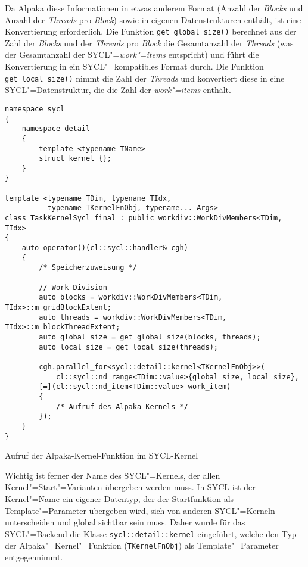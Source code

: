 Da Alpaka diese Informationen in etwas anderem Format (Anzahl der
\textit{Blocks} und Anzahl der \textit{Threads} pro \textit{Block}) sowie in
eigenen Datenstrukturen enthält, ist eine Konvertierung erforderlich. Die
Funktion \texttt{get\_global\_size()} berechnet aus der Zahl der \textit{Blocks}
und der \textit{Threads} pro \textit{Block} die Gesamtanzahl der
\textit{Threads} (was der Gesamtanzahl der SYCL"=\textit{work"=items}
entspricht) und führt die Konvertierung in ein SYCL"=kompatibles Format durch.
Die Funktion \texttt{get\_local\_size()} nimmt die Zahl der \textit{Threads} und
konvertiert diese in eine SYCL"=Datenstruktur, die die Zahl der
\textit{work"=items} enthält.

\begin{code}
    \begin{verbatim}
namespace sycl
{
    namespace detail
    {
        template <typename TName>
        struct kernel {};
    }
}

template <typename TDim, typename TIdx,
          typename TKernelFnObj, typename... Args>
class TaskKernelSycl final : public workdiv::WorkDivMembers<TDim, TIdx>
{
    auto operator()(cl::sycl::handler& cgh)
    {
        /* Speicherzuweisung */

        // Work Division
        auto blocks = workdiv::WorkDivMembers<TDim, TIdx>::m_gridBlockExtent;
        auto threads = workdiv::WorkDivMembers<TDim, TIdx>::m_blockThreadExtent;
        auto global_size = get_global_size(blocks, threads);
        auto local_size = get_local_size(threads);

        cgh.parallel_for<sycl::detail::kernel<TKernelFnObj>>(
            cl::sycl::nd_range<TDim::value>{global_size, local_size},
        [=](cl::sycl::nd_item<TDim::value> work_item)
        {
            /* Aufruf des Alpaka-Kernels */
        });
    }
}
    \end{verbatim}
    \caption{Aufruf der Alpaka-Kernel-Funktion im SYCL-Kernel}
    \label{implementierung:task:kernel:launch}
\end{code}

Wichtig ist ferner der Name des SYCL"=Kernels, der allen
Kernel"=Start"=Varianten übergeben werden muss. In SYCL ist der Kernel"=Name ein
eigener Datentyp, der der Startfunktion als Template"=Parameter übergeben wird,
sich von anderen SYCL"=Kerneln unterscheiden und global sichtbar sein muss.
Daher wurde für das SYCL"=Backend die Klasse \texttt{sycl::detail::kernel}
eingeführt, welche den Typ der Alpaka"=Kernel"=Funktion (\texttt{TKernelFnObj})
als Template"=Parameter entgegennimmt.

